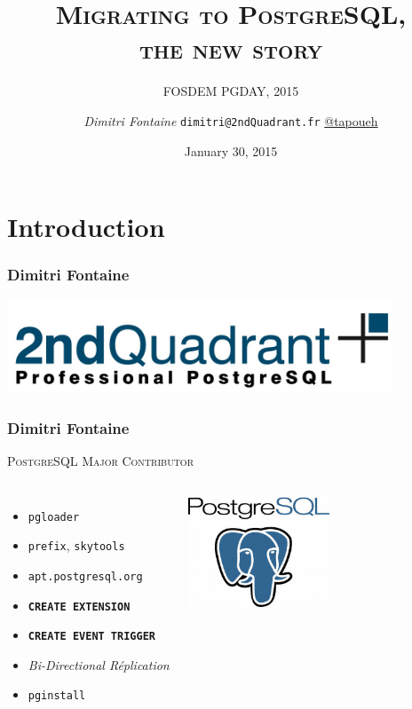 \documentclass{beamer}
\title{\textsc{Migrating to PostgreSQL, \\ the new story}}
\subtitle{FOSDEM PGDAY, 2015}
\author{\textit{Dimitri Fontaine} \texttt{dimitri@2ndQuadrant.fr}
  \linebreak
  \url{@tapoueh}}
\date{January 30, 2015}
\begin{document}
\frame{\titlepage}

\section{Introduction}

\begin{frame}
  \frametitle{Dimitri Fontaine}

  \begin{center}
    \includegraphics[height=1.1in]{2ndquadrant_logo_full_color.jpg}
  \end{center}
\end{frame}

\begin{frame}[fragile]
  \frametitle{Dimitri Fontaine}

  \begin{center}
    {\Large \textsc{PostgreSQL Major Contributor}}
  \end{center}

  \begin{columns}[c]

    \begin{itemize}
    \item \texttt{pgloader}
    \item \texttt{prefix}, \texttt{skytools}
    \item \texttt{apt.postgresql.org}
    \item \texttt{\textbf{CREATE EXTENSION}}
    \item \texttt{\textbf{CREATE EVENT TRIGGER}}
    \item \textit{Bi-Directional Réplication}
    \item \texttt{pginstall}
    \end{itemize}  

    \begin{center}
      \includegraphics[height=9em]{postgres-logo.png}
    \end{center}
  \end{columns}
\end{frame}
\end{document}
